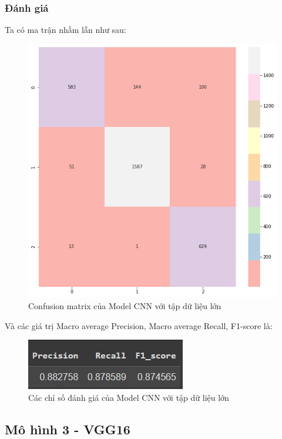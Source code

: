 \subsubsection{Đánh giá}
Ta có ma trận nhầm lẫn như sau:
\begin{center}
    \begin{figure}[!h]
        \centering
        \includegraphics[scale = 0.42]{fileanh/CNNtc1.png}
        \caption{Confusion matrix của Model CNN với tập dữ liệu lớn}
    \end{figure}
\end{center}
\newpage
Và các giá trị Macro average Precision, Macro average Recall, F1-score là:
\begin{center}
    \begin{figure}[!h]
        \centering
        \includegraphics[scale = 1.5]{fileanh/CNNtc2.jpg}
        \caption{Các chỉ số đánh giá của Model CNN với tập dữ liệu lớn}
    \end{figure}
\end{center}

\subsection{Mô hình 3 - VGG16}
